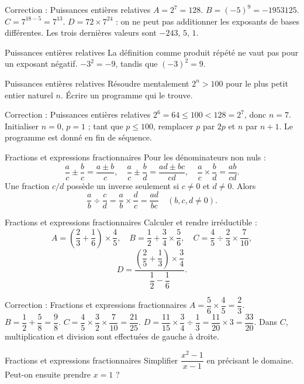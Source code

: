 \documentclass[aspectratio=169,10pt]{beamer}
\begin{document}
\begin{frame}{Correction : Puissances entières relatives}
\(A=2^7=128\). \(B=(-5)^9=-1953125\). \(C=7^{18-5}=7^{13}\). \(D=72\times7^{24}\) : on ne peut pas additionner les exposants de bases différentes. Les trois dernières valeurs sont \(-243\), \(5\), \(1\).
\end{frame}
\begin{frame}{Puissances entières relatives}
La définition comme produit répété ne vaut pas pour un exposant négatif. \(-3^2=-9\), tandis que \((-3)^2=9\).
\end{frame}
\begin{frame}{Puissances entières relatives}
Résoudre mentalement \(2^n>100\) pour le plus petit entier naturel \(n\). Écrire un programme qui le trouve.
\end{frame}
\begin{frame}{Correction : Puissances entières relatives}
\(2^6=64\leq100<128=2^7\), donc \(n=7\). Initialiser \(n=0\), \(p=1\) ; tant que \(p\leq100\), remplacer \(p\) par \(2p\) et \(n\) par \(n+1\). Le programme est donné en fin de séquence.
\end{frame}
\begin{frame}{Fractions et expressions fractionnaires}
Pour les dénominateurs non nuls :
\[\dfrac ac\pm\dfrac bc=\dfrac{a\pm b}{c},\quad\dfrac ac\pm\dfrac bd=\dfrac{ad\pm bc}{cd},\quad\dfrac ac\times\dfrac bd=\dfrac{ab}{cd}.\]
Une fraction \(c/d\) possède un inverse seulement si \(c\ne0\) et \(d\ne0\). Alors
\[\dfrac ab\div\dfrac cd=\dfrac ab\times\dfrac dc=\dfrac{ad}{bc}\quad(b,c,d\ne0).\]
\end{frame}
\begin{frame}{Fractions et expressions fractionnaires}
Calculer et rendre irréductible :
\[A=\left(\dfrac23+\dfrac16\right)\times\dfrac45,\quad B=\dfrac12+\dfrac34\times\dfrac56,\quad C=\dfrac45\div\dfrac23\times\dfrac7{10},\]
\[D=\dfrac{\left(\dfrac25+\dfrac13\right)\times\dfrac34}{\dfrac12-\dfrac16}.\]
\end{frame}
\begin{frame}{Correction : Fractions et expressions fractionnaires}
\(A=\dfrac56\times\dfrac45=\dfrac23\). \(B=\dfrac12+\dfrac58=\dfrac98\). \(C=\dfrac45\times\dfrac32\times\dfrac7{10}=\dfrac{21}{25}\). \(D=\dfrac{11}{15}\times\dfrac34\div\dfrac13=\dfrac{11}{20}\times3=\dfrac{33}{20}\). Dans \(C\), multiplication et division sont effectuées de gauche à droite.
\end{frame}
\begin{frame}{Fractions et expressions fractionnaires}
Simplifier \(\dfrac{x^2-1}{x-1}\) en précisant le domaine. Peut-on ensuite prendre \(x=1\) ?
\end{frame}
\end{document}
